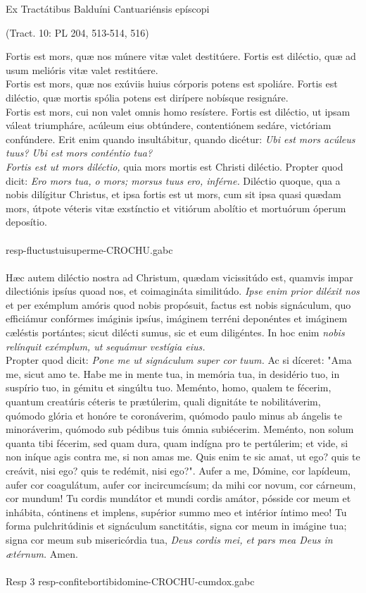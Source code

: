 \documentclass[options]{article}
\begin{document}
	Ex Tractátibus Balduíni Cantuariénsis epíscopi 
	\begin{flushright}
		(Tract. 10: PL 204, 513-514, 516)
	\end{flushright}
Fortis est mors, quæ nos múnere vitæ valet destitúere. Fortis est diléctio, quæ ad usum melióris vitæ valet restitúere.\\ 
Fortis est mors, quæ nos exúviis huius córporis potens est spoliáre. Fortis est diléctio, quæ mortis spólia potens est dirípere nobísque resignáre.\\ 
Fortis est mors, cui non valet omnis homo resístere. Fortis est diléctio, ut ipsam váleat triumpháre, acúleum eius obtúndere, contentiónem sedáre, victóriam confúndere. Erit enim quando insultábitur, quando dicétur: 
\emph{Ubi est mors acúleus tuus? Ubi est mors conténtio tua?}\\
\emph{Fortis est ut mors diléctio,}
quia mors mortis est Christi diléctio. Propter quod dicit: 
\emph{Ero mors tua, o mors; morsus tuus ero, inférne.}
Diléctio quoque, qua a nobis dilígitur Christus, et ipsa fortis est ut mors, cum sit ipsa quasi quædam mors, útpote véteris vitæ exstínctio et vitiórum abolítio et mortuórum óperum deposítio. \\
\\
resp-fluctustuisuperme-CROCHU.gabc\\
\\
Hæc autem diléctio nostra ad Christum, quædam vicissitúdo est, quamvis impar dilectiónis ipsíus quoad nos, et coimagináta similitúdo. 
\emph{Ipse enim prior diléxit nos}
et per exémplum amóris quod nobis propósuit, factus est nobis signáculum, quo efficiámur confórmes imáginis ipsíus, imáginem terréni deponéntes et imáginem cæléstis portántes; sicut dilécti sumus, sic et eum diligéntes. In hoc enim 
\emph{nobis relínquit exémplum, ut sequámur vestígia eius.}\\
  Propter quod dicit: 
  \emph{Pone me ut signáculum super cor tuum.}
  Ac si díceret: "Ama me, sicut amo te. Habe me in mente tua, in memória tua, in desidério tuo, in suspírio tuo, in gémitu et singúltu tuo. Meménto, homo, qualem te fécerim, quantum creatúris céteris te prætúlerim, quali dignitáte te nobilitáverim, quómodo glória et honóre te coronáverim, quómodo paulo minus ab ángelis te minoráverim, quómodo sub pédibus tuis ómnia subiécerim. Meménto, non solum quanta tibi fécerim, sed quam dura, quam indígna pro te pertúlerim; et vide, si non iníque agis contra me, si non amas me. Quis enim te sic amat, ut ego? quis te creávit, nisi ego? quis te redémit, nisi ego?". 
  Aufer a me, Dómine, cor lapídeum, aufer cor coagulátum, aufer cor incircumcísum; da mihi cor novum, cor cárneum, cor mundum! Tu cordis mundátor et mundi cordis amátor, pósside cor meum et inhábita, cóntinens et implens, supérior summo meo et intérior íntimo meo! Tu forma pulchritúdinis et signáculum sanctitátis, signa cor meum in imágine tua; signa cor meum sub misericórdia tua,
  \emph{Deus cordis mei, et pars mea Deus in ætérnum.}
  Amen.\\
  \\
  
Resp 3  resp-confitebortibidomine-CROCHU-cumdox.gabc
  
\end{document}
